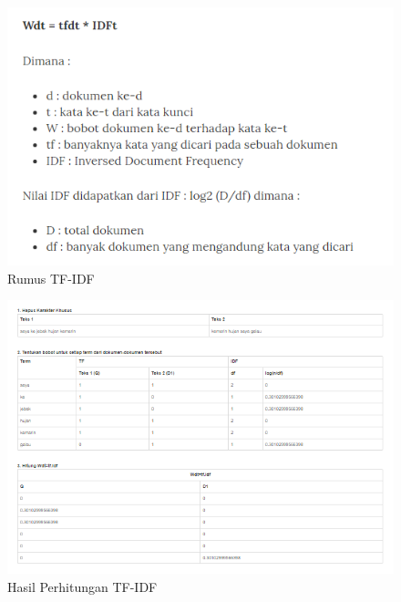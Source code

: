 \begin{figure}
      \centerline{\includegraphics[width=1\textwidth]
      {figures/cokro/c59}}
      \caption{Rumus  TF-IDF}
      \label{c59}
      \end{figure}

\begin{figure}
      \centerline{\includegraphics[width=1\textwidth]
      {figures/cokro/c60}}
      \caption{Hasil Perhitungan TF-IDF}
      \label{c60}
      \end{figure}

